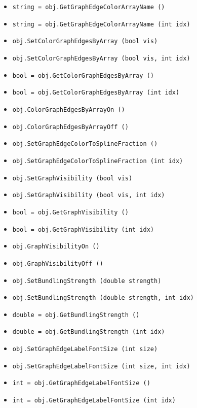 \begin{itemize}
\item  \verb|string = obj.GetGraphEdgeColorArrayName ()|

\item  \verb|string = obj.GetGraphEdgeColorArrayName (int idx)|

\item  \verb|obj.SetColorGraphEdgesByArray (bool vis)|

\item  \verb|obj.SetColorGraphEdgesByArray (bool vis, int idx)|

\item  \verb|bool = obj.GetColorGraphEdgesByArray ()|

\item  \verb|bool = obj.GetColorGraphEdgesByArray (int idx)|

\item  \verb|obj.ColorGraphEdgesByArrayOn ()|

\item  \verb|obj.ColorGraphEdgesByArrayOff ()|

\item  \verb|obj.SetGraphEdgeColorToSplineFraction ()|

\item  \verb|obj.SetGraphEdgeColorToSplineFraction (int idx)|

\item  \verb|obj.SetGraphVisibility (bool vis)|

\item  \verb|obj.SetGraphVisibility (bool vis, int idx)|

\item  \verb|bool = obj.GetGraphVisibility ()|

\item  \verb|bool = obj.GetGraphVisibility (int idx)|

\item  \verb|obj.GraphVisibilityOn ()|

\item  \verb|obj.GraphVisibilityOff ()|

\item  \verb|obj.SetBundlingStrength (double strength)|

\item  \verb|obj.SetBundlingStrength (double strength, int idx)|

\item  \verb|double = obj.GetBundlingStrength ()|

\item  \verb|double = obj.GetBundlingStrength (int idx)|

\item  \verb|obj.SetGraphEdgeLabelFontSize (int size)|

\item  \verb|obj.SetGraphEdgeLabelFontSize (int size, int idx)|

\item  \verb|int = obj.GetGraphEdgeLabelFontSize ()|

\item  \verb|int = obj.GetGraphEdgeLabelFontSize (int idx)|

\end{itemize}
